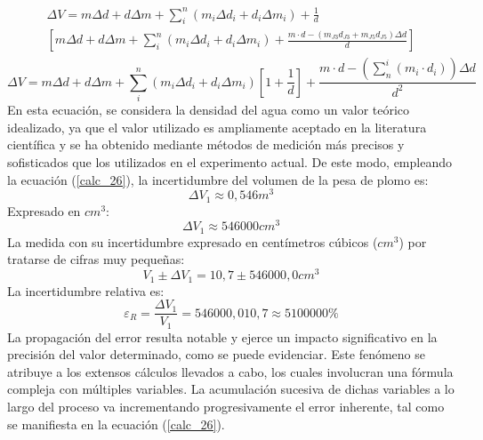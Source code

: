 \documentclass[../main.tex]{subfiles}
\begin{document}
\begin{align} \nonumber
    \begin{split}
    \Delta V= m\Delta d+d\Delta m + 
    \sum_i^n (m_i\Delta d_i+d_i\Delta m_i) + \frac{1}{d}  \\
    \left[ m\Delta d+d\Delta m +  \sum_i^n (m_i\Delta d_i+d_i\Delta m_i)+
    \frac{m\cdot d-(m_{J3}d_{J3}+m_{J5}d_{J5}) \Delta d}{d} \right]
     \end{split}
  \end{align}
\begin{equation} \label{calc_26}
    \Delta V= m\Delta d+d\Delta m+
    \sum_i^n(m_i\Delta d_i+d_i\Delta m_i)\left[1+\frac{1}{d}\right]+
    \frac{m\cdot d-(\sum^i_n(m_i\cdot d_i))\Delta d}{d^2}
\end{equation}
En esta ecuación, se considera la densidad del agua como un valor teórico idealizado, ya que el valor 
utilizado es ampliamente aceptado en la literatura científica y se ha obtenido mediante métodos de medición 
más precisos y sofisticados que los utilizados en el experimento actual.
De este modo, empleando la ecuación (\ref{calc_26}), la incertidumbre del volumen de la pesa de plomo es:
\[\Delta V_1\approx 0,546 m^3\]
Expresado en $cm^3$:
\[\Delta V_1\approx 546000 cm^3\]
La medida con su incertidumbre expresado en centímetros cúbicos ($cm^3$) por tratarse de cifras muy pequeñas:
\[V_1\pm\Delta V_1=10,7\pm 546000,0 cm^3\]
La incertidumbre relativa es:
\[\varepsilon_R= \frac{\Delta V_1}{V_1}=546000,010,7\approx 5100000\%\]
La propagación del error resulta notable y ejerce un impacto significativo 
en la precisión del valor determinado, como se puede evidenciar. Este 
fenómeno se atribuye a los extensos cálculos llevados a cabo, los cuales involucran una 
fórmula compleja con múltiples variables. La acumulación sucesiva de dichas variables a 
lo largo del proceso va incrementando progresivamente el error inherente, tal como se 
manifiesta en la ecuación (\ref{calc_26}).
\end{document}
